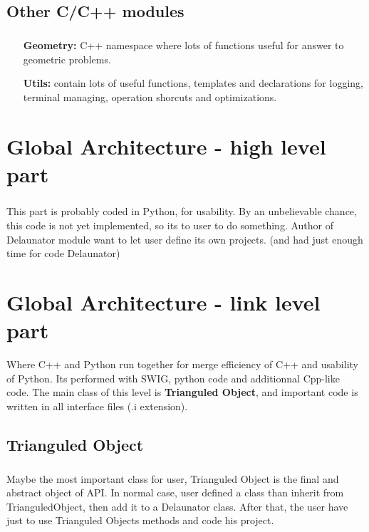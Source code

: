 \documentclass{report}
\begin{document}
\section{Other C/C++ modules}
    \paragraph*{}
    \begin{itemize}
        \item[\textbf{Geometry:}] C++ namespace where lots of functions useful for answer to geometric problems.
        \item[\textbf{Utils:}] contain lots of useful functions, templates and declarations for logging, terminal managing, operation shorcuts and optimizations.
    \end{itemize}




\chapter{Global Architecture - high level part}
    \paragraph*{}
    This part is probably coded in Python, for usability. By an unbelievable chance, this code is not yet implemented, so its to user to do something.
    Author of Delaunator module want to let user define its own projects. (and had just enough time for code Delaunator)




\chapter{Global Architecture - link level part}
Where C++ and Python run together for merge efficiency of C++ and usability of Python.
Its performed with SWIG, python code and additionnal Cpp-like code. 
The main class of this level is \textbf{Trianguled Object}, and important code is written in all interface files (.i extension).

\section{Trianguled Object}
    \paragraph*{}
    Maybe the most important class for user, Trianguled Object is the final and abstract object of API. 
    In normal case, user defined a class than inherit from TrianguledObject, then add it to a Delaunator class.
    After that, the user have just to use Trianguled Objects methods and code his project.
\end{document}
